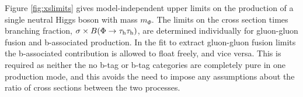 Figure \ref{fig:xslimits} gives model-independent upper limits on the production of a single neutral Higgs boson with mass $m_{\Phi}$. The limits on the cross section times branching fraction, $\sigma\times B(\Phi\rightarrow\tau_{\rm h}\tau_{\rm h})$, are determined individually for gluon-gluon fusion and b-associated production. In the fit to extract gluon-gluon fusion limits the b-associated contribution is allowed to float freely, and vice versa. This is required as neither the no b-tag or b-tag categories are completely pure in one production mode, and this avoids the need to impose any assumptions about the ratio of cross sections between the two processes.


